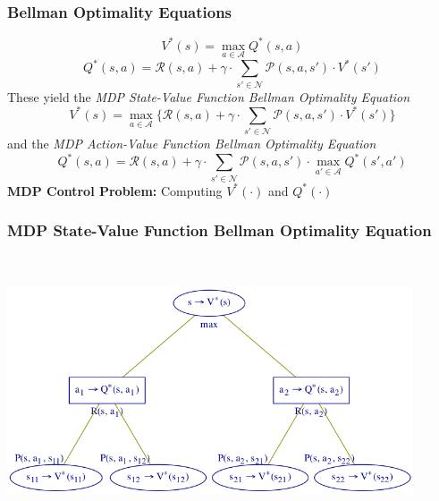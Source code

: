 \documentclass[handout]{beamer}
\begin{document}
\begin{frame}
\frametitle{Bellman Optimality Equations}
\pause
\begin{equation}
V^*(s) = \max_{a\in \mathcal{A}} Q^*(s,a)
\label{eq:mdp_bellman_opt_eqn_vq}
\end{equation}
\pause
\begin{equation}
Q^*(s,a) = \mathcal{R}(s,a) + \gamma \cdot \sum_{s' \in \mathcal{N}} \mathcal{P}(s,a,s') \cdot V^*(s')
 \label{eq:mdp_bellman_opt_eqn_qv}
\end{equation}
\pause
These yield the {\em MDP State-Value Function Bellman Optimality Equation}
\begin{equation}
V^*(s) = \max_{a\in \mathcal{A}} \{ \mathcal{R}(s,a) + \gamma \cdot \sum_{s' \in \mathcal{N}} \mathcal{P}(s,a,s') \cdot V^*(s') \}
\label{eq:mdp_bellman_opt_eqn_vv}
\end{equation}
\pause
and the {\em MDP Action-Value Function Bellman Optimality Equation}
\begin{equation}
Q^*(s,a) = \mathcal{R}(s,a) + \gamma \cdot \sum_{s' \in \mathcal{N}} \mathcal{P}(s,a,s') \cdot \max_{a'\in \mathcal{A}} Q^*(s',a')
\label{eq:mdp_bellman_opt_eqn_qq}
\end{equation}
{\bf MDP Control Problem:} Computing $V^*(\cdot)$ and $Q^*(\cdot)$
\end{frame}

\begin{frame}
\frametitle{MDP State-Value Function Bellman Optimality Equation}
\includegraphics[width=12cm, height=8cm]{mdp_bellman_opt_tree_vv.png}
\end{frame}
\end{document}
